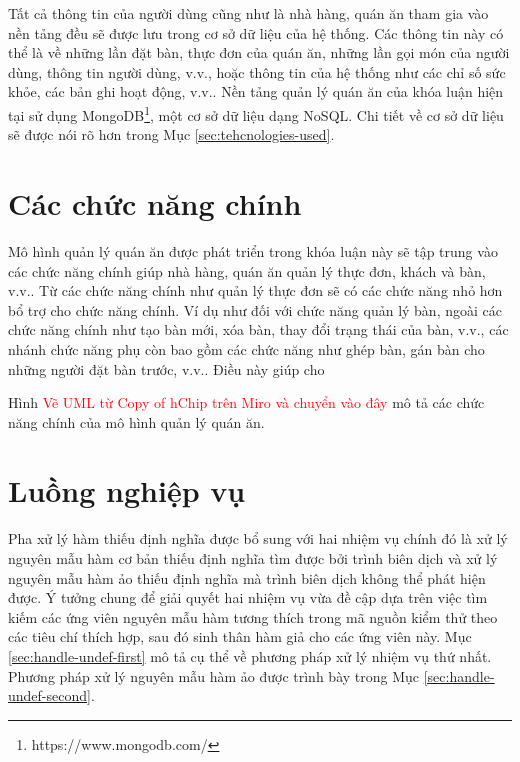 Tất cả thông tin của người dùng cũng như là nhà hàng, quán ăn tham gia vào nền tảng đều sẽ được lưu trong cơ sở dữ liệu của hệ thống. Các thông tin này có thể là về những lần đặt bàn, thực đơn của quán ăn, những lần gọi món của người dùng, thông tin người dùng, v.v., hoặc thông tin của hệ thống như các chỉ số sức khỏe, các bản ghi hoạt động, v.v.. Nền tảng quản lý quán ăn của khóa luận hiện tại sử dụng MongoDB\footnote{https://www.mongodb.com/}, một cơ sở dữ liệu dạng NoSQL. Chi tiết về cơ sở dữ liệu sẽ được nói rõ hơn trong Mục \autoref{sec:tehcnologies-used}.

\section{Các chức năng chính}\label{sec:main-functions}
Mô hình quản lý quán ăn được phát triển trong khóa luận này sẽ tập trung vào các chức năng chính giúp nhà hàng, quán ăn quản lý thực đơn, khách và bàn, v.v..
Từ các chức năng chính như quản lý thực đơn sẽ có các chức năng nhỏ hơn bổ trợ cho chức năng chính.
Ví dụ như đối với chức năng quản lý bàn, ngoài các chức năng chính như tạo bàn mới, xóa bàn, thay đổi trạng thái của bàn, v.v., các nhánh chức năng phụ còn bao gồm các chức năng như ghép bàn, gán bàn cho những người đặt bàn trước, v.v..
Điều này giúp cho 

Hình \textcolor{red}{Vẽ UML từ Copy of hChip trên Miro và chuyển vào đây} mô tả các chức năng chính của mô hình quản lý quán ăn.


\section{Luồng nghiệp vụ} \label{sec:handle-undef}
Pha xử lý hàm thiếu định nghĩa được bổ sung với hai nhiệm vụ chính đó là xử lý nguyên mẫu hàm cơ bản thiếu định nghĩa tìm được bởi trình biên dịch và xử lý nguyên mẫu hàm ảo thiếu định nghĩa mà trình biên dịch không thể phát hiện được. Ý tưởng chung để giải quyết hai nhiệm vụ vừa đề cập dựa trên việc tìm kiếm các ứng viên nguyên mẫu hàm tương thích trong mã nguồn kiểm thử theo các tiêu chí thích hợp, sau đó sinh thân hàm giả cho các ứng viên này. Mục \autoref{sec:handle-undef-first} mô tả cụ thể về phương pháp xử lý nhiệm vụ thứ nhất. Phương pháp xử lý nguyên mẫu hàm ảo được trình bày trong Mục \autoref{sec:handle-undef-second}.

